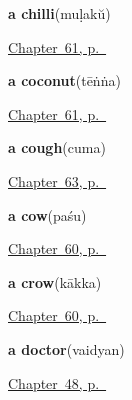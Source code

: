 \noindent\begin{minipage}[t]{\linewidth}
\raggedright
\textbf{a chilli}\enspace\emph{}\enspace(muḷakŭ)\par
\footnotesize \hyperref[ch:ml-on-the-kitchen-shelf]{Chapter~61, p.~\pageref*{ch:ml-on-the-kitchen-shelf}}
\end{minipage}\par\smallskip

\noindent\begin{minipage}[t]{\linewidth}
\raggedright
\textbf{a coconut}\enspace\emph{}\enspace(tēṅṅa)\par
\footnotesize \hyperref[ch:ml-on-the-kitchen-shelf]{Chapter~61, p.~\pageref*{ch:ml-on-the-kitchen-shelf}}
\end{minipage}\par\smallskip

\noindent\begin{minipage}[t]{\linewidth}
\raggedright
\textbf{a cough}\enspace\emph{}\enspace(cuma)\par
\footnotesize \hyperref[ch:ml-how-the-body-reports]{Chapter~63, p.~\pageref*{ch:ml-how-the-body-reports}}
\end{minipage}\par\smallskip

\noindent\begin{minipage}[t]{\linewidth}
\raggedright
\textbf{a cow}\enspace\emph{}\enspace(paśu)\par
\footnotesize \hyperref[ch:ml-animals-around-a-house]{Chapter~60, p.~\pageref*{ch:ml-animals-around-a-house}}
\end{minipage}\par\smallskip

\noindent\begin{minipage}[t]{\linewidth}
\raggedright
\textbf{a crow}\enspace\emph{}\enspace(kākka)\par
\footnotesize \hyperref[ch:ml-animals-around-a-house]{Chapter~60, p.~\pageref*{ch:ml-animals-around-a-house}}
\end{minipage}\par\smallskip

\noindent\begin{minipage}[t]{\linewidth}
\raggedright
\textbf{a doctor}\enspace\emph{}\enspace(vaidyan)\par
\footnotesize \hyperref[ch:ml-roles]{Chapter~48, p.~\pageref*{ch:ml-roles}}
\end{minipage}\par\smallskip

